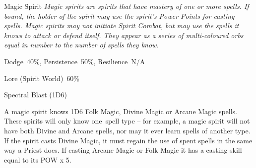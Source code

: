 \begin{monsterbox}{Magic Spirit}
	\textit{Magic spirits are spirits that have mastery of one or more spells. If bound, the holder of the spirit may use the spirit’s Power Points for casting spells. Magic spirits may not initiate Spirit Combat, but may use the spells it knows to attack or defend itself. They appear as a series of multi-coloured orbs equal in number to the number of spells they know.}\\
	\rpghline
	\basics[%
	powerpoints = 14,
	movementrate = 30m,
	plunderrating = 0
	]
	\rpghline%
	\stats[ %
		STR = -,
		CON = -,
		DEX = -,
		SIZ = -,
		INT = 3D6    (11),
		POW = 4D6    (14),
		CHA = 1D6    (4)
	]
	\rpghline%
	\begin{rpg-monsteraction}[Resistances]
		Dodge~40\%, Persistence~50\%, Resilience~N/A
	\end{rpg-monsteraction}
	\begin{rpg-monsteraction}[Knowledge]
		Lore (Spirit World)~60\%
	\end{rpg-monsteraction}
	\begin{rpg-monsteraction}
		Spectral Blast (1D6)
	\end{rpg-monsteraction}
	\begin{rpg-monsteraction}[Magic]
		A magic spirit knows 1D6 Folk Magic, Divine Magic or Arcane Magic spells. These spirits will only know one spell type – for example, a magic spirit will not have both Divine and Arcane spells, nor may it ever learn spells of another type. If the spirit casts Divine Magic, it must regain the use of spent spells in the same way a Priest does. If casting Arcane Magic or Folk Magic it has a casting skill equal to its POW x 5.
	\end{rpg-monsteraction}
\end{monsterbox}



